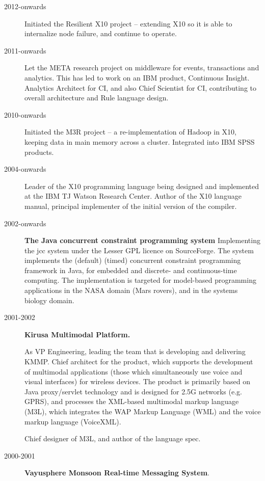 \documentclass{article}
\begin{document}
\begin{description}
\item[2012-onwards] Initiated the Resilient X10 project -- extending
  X10 so it is able to internalize node failure, and continue to
  operate. 

\item[2011-onwards] Let the META research project on middleware for
  events, transactions and analytics. This has led to work on an IBM
  product, Continuous Insight. Analytics Architect for CI, and also
  Chief Scientist for CI, contributing to overall architecture and
  Rule language design.

\item[2010-onwards] Initiated the M3R project -- a re-implementation
  of Hadoop in X10, keeping  data in main memory across a
  cluster. Integrated into IBM SPSS products. 

\item[2004-onwards] Leader of the \textsf{ X10} programming language
being designed and implemented at the IBM TJ Watson Research
Center. Author of the \textsf{X10} language manual, principal
implementer of the initial version of the compiler.

 \item[2002-onwards] \textbf{The Java concurrent constraint programming
system} Implementing the \textsf{ jcc} system under the Lesser GPL
licence on SourceForge. The system implements the (default) (timed)
concurrent constraint programming framework in Java, for embedded
and discrete- and continuous-time computing. The implementation is
targeted for model-based programming applications in the NASA domain
(Mars rovers), and in the systems biology domain.

 \item[2001-2002] \textbf{Kirusa Multimodal Platform.}

 As VP Engineering, leading the team that is developing and delivering
 KMMP.  Chief architect for the product, which supports the development
 of multimodal applications (those which simultaneously use voice and
 visual interfaces) for wireless devices. The product is primarily
 based on Java proxy/servlet technology and is designed for 2.5G
 networks (e.g.{} GPRS), and processes the XML-based multimodal markup
 language (M3L), which integrates the WAP Markup Language (WML) and the
 voice markup language (VoiceXML).

 Chief designer of M3L, and author of the language spec.

\item[2000-2001] \textbf{Vayusphere Monsoon Real-time Messaging System}.


\end{description}
\end{document}
